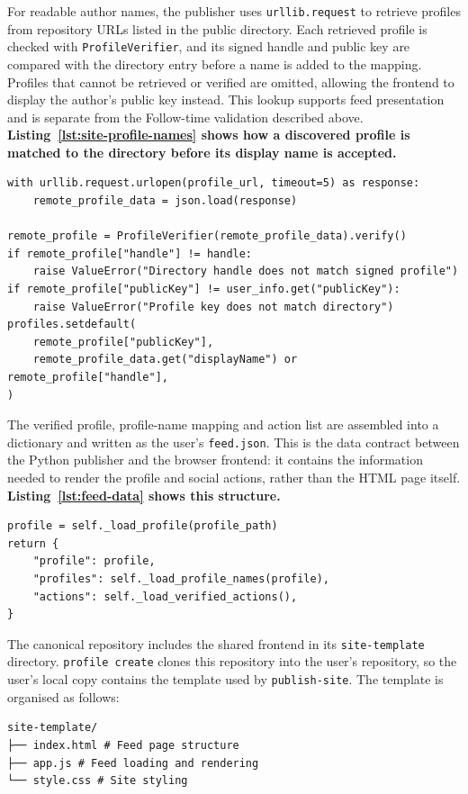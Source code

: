 For readable author names, the publisher uses
\texttt{urllib.request} to retrieve profiles from repository URLs listed in
the public directory. Each retrieved profile is checked with
\texttt{ProfileVerifier}, and its signed handle and public key are compared
with the directory entry before a name is added to the mapping. Profiles
that cannot be retrieved or verified are omitted, allowing the frontend to
display the author's public key instead. This lookup supports feed
presentation and is separate from the Follow-time validation described
above. \textbf{Listing~\ref{lst:site-profile-names} shows how a discovered
profile is matched to the directory before its display name is accepted.}

\begin{lstlisting}[caption={Checking discovered profiles before adding display names},label={lst:site-profile-names}]
with urllib.request.urlopen(profile_url, timeout=5) as response:
    remote_profile_data = json.load(response)

remote_profile = ProfileVerifier(remote_profile_data).verify()
if remote_profile["handle"] != handle:
    raise ValueError("Directory handle does not match signed profile")
if remote_profile["publicKey"] != user_info.get("publicKey"):
    raise ValueError("Profile key does not match directory")
profiles.setdefault(
    remote_profile["publicKey"],
    remote_profile_data.get("displayName") or remote_profile["handle"],
)
\end{lstlisting}

The verified profile, profile-name mapping and action list are
assembled into a dictionary and written as the user's \texttt{feed.json}.
This is the data contract between the Python publisher and the browser
frontend: it contains the information needed to render the profile and
social actions, rather than the HTML page itself.
\textbf{Listing~\ref{lst:feed-data} shows this structure.}

\begin{lstlisting}[caption={Assembling the profile, names and verified actions for feed.json},label={lst:feed-data}]
profile = self._load_profile(profile_path)
return {
    "profile": profile,
    "profiles": self._load_profile_names(profile),
    "actions": self._load_verified_actions(),
}
\end{lstlisting}

The canonical repository includes the shared frontend in its
\texttt{site-template} directory. \texttt{profile create} clones this
repository into the user's repository, so the user's local copy contains
the template used by \texttt{publish-site}. The template is organised as
follows: \begin{verbatim} 
site-template/ 
├── index.html # Feed page structure 
├── app.js # Feed loading and rendering 
└── style.css # Site styling 
\end{verbatim}

